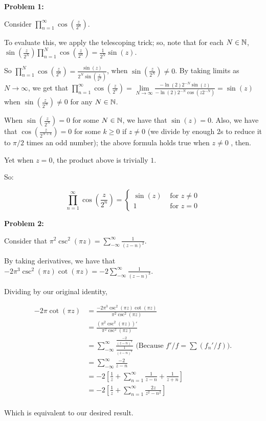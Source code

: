 \documentclass[a4paper,12pt]{article}
\begin{document}
{\bf Problem 1:}

Consider $\prod\limits_{n=1}^\infty \cos(\frac{z}{2^n})$.

To evaluate this, we apply the telescoping trick; so, note that for each $N \in \mathbb{N}$, $\sin(\frac{z}{2^N}) \prod\limits_{n=1}^N \cos(\frac{z}{2^n}) = \frac{1}{2^N} \sin(z)$.

So $\prod\limits_{n=1}^N \cos(\frac{z}{2^n}) = \frac{\sin(z)}{2^N \sin(\frac{z}{2^N})}$, when $\sin(\frac{z}{2^N}) \neq 0$. By taking limits as $N \to \infty$, we get that $\prod\limits_{n=1}^\infty \cos(\frac{z}{2^n}) = \lim\limits_{N \to \infty} \frac{-\ln(2)2^{-N}\sin(z)}{-\ln(2)2^{-N}\cos(z2^{-N})} = \sin(z)$ when $\sin(\frac{z}{2^N}) \neq 0$ for any $N \in \mathbb{N}$. 

When $\sin(\frac{z}{2^N}) = 0$ for some $N \in \mathbb{N}$, we have that $\sin(z) = 0$. Also, we have that $\cos(\frac{z}{2^{N+k}}) = 0$ for some $k \geq 0$ if $z \neq 0$ (we divide by enough $2$s to reduce it to $\pi/2$ times an odd number); the above formula holds true when $z \neq 0$ , then.

Yet when $z = 0$, the product above is trivially $1$.

So:

\begin{displaymath}
\prod\limits_{n=1}^\infty \cos(\frac{z}{2^n}) = 
   \left\{
     \begin{array}{lr}
       \sin(z)  & \text{ for } z \neq 0 \\
       1 & \text{ for } z=0 
     \end{array}
   \right.
\end{displaymath}

\shunt

{\bf Problem 2:}

Consider that $\pi^2 \csc^2(\pi z) = \sum\limits_{-\infty}^\infty \frac{1}{(z-n)^2}$.

By taking derivatives, we have that $-2\pi^3\csc^2(\pi z)\cot(\pi z) = -2\sum\limits_{-\infty}^\infty \frac{1}{(z-n)^3}$.

Dividing by our original identity, 

\begin{align*}
-2\pi \cot(\pi z) &= \frac{-2\pi^3\csc^2(\pi z)\cot(\pi z)}{\pi^2 \csc^2(\pi z)}\\
&= \frac{(\pi^2 \csc^2(\pi z))'}{\pi^2 \csc^2(\pi z)}\\
&= \sum\limits_{-\infty}^\infty \frac{\frac{-2}{(z-n)^3}}{\frac{1}{(z-n)^2}} \text{ (Because }f'/f = \sum (f_n'/f)).\\
&= \sum\limits_{-\infty}^\infty \frac{-2}{z-n}\\
&= -2\left[\frac{1}{z} + \sum\limits_{n=1}^\infty \frac{1}{z-n} + \frac{1}{z+n} \right]\\
&= -2\left[\frac{1}{z} + \sum\limits_{n=1}^\infty \frac{2z}{z^2-n^2} \right]\\
\end{align*}

Which is equivalent to our desired result.

\shunt
\end{document}
